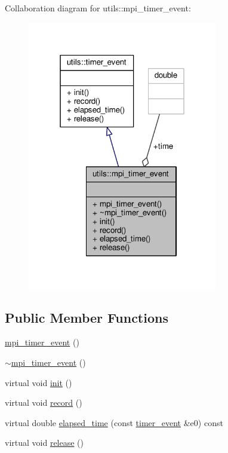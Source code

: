 Collaboration diagram for utils\-:\-:mpi\-\_\-timer\-\_\-event\-:
\nopagebreak
\begin{figure}[H]
\begin{center}
\leavevmode
\includegraphics[width=235pt]{structutils_1_1mpi__timer__event__coll__graph}
\end{center}
\end{figure}
\subsection*{Public Member Functions}
\begin{DoxyCompactItemize}
\item 
\hyperlink{structutils_1_1mpi__timer__event_ae2772a320fa0db06f2634fded07de40f}{mpi\-\_\-timer\-\_\-event} ()
\item 
\hyperlink{structutils_1_1mpi__timer__event_aca22e55f931fd380b31024d3273229b5}{$\sim$mpi\-\_\-timer\-\_\-event} ()
\item 
virtual void \hyperlink{structutils_1_1mpi__timer__event_a0527b2cb58983cc22521a79cadada734}{init} ()
\item 
virtual void \hyperlink{structutils_1_1mpi__timer__event_a7c3bae9bcc4ec16fa7eef35fc03b8326}{record} ()
\item 
virtual double \hyperlink{structutils_1_1mpi__timer__event_a45dae6ae22f26fcaa7ff8c6f417e7bbe}{elapsed\-\_\-time} (const \hyperlink{structutils_1_1timer__event}{timer\-\_\-event} \&e0) const 
\item 
virtual void \hyperlink{structutils_1_1mpi__timer__event_a8929b157ca17992c0d2101eb099a7cc7}{release} ()
\end{DoxyCompactItemize}
